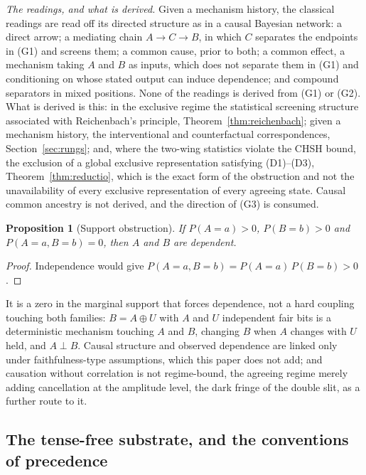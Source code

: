 \documentclass[11pt]{article}
\newtheorem{proposition}{Proposition}
\begin{document}
\textit{The readings, and what is derived.} Given a mechanism history, the classical readings are read off its directed structure as in a causal Bayesian network: a direct arrow; a mediating chain $A \to C \to B$, in which $C$ separates the endpoints in (G1) and screens them; a common cause, prior to both; a common effect, a mechanism taking $A$ and $B$ as inputs, which does not separate them in (G1) and conditioning on whose stated output can induce dependence; and compound separators in mixed positions. None of the readings is derived from (G1) or (G2). What is derived is this: in the exclusive regime the statistical screening structure associated with Reichenbach's principle, Theorem~\ref{thm:reichenbach}; given a mechanism history, the interventional and counterfactual correspondences, Section~\ref{sec:rungs}; and, where the two-wing statistics violate the CHSH bound, the exclusion of a global exclusive representation satisfying (D1)--(D3), Theorem~\ref{thm:reductio}, which is the exact form of the obstruction and not the unavailability of every exclusive representation of every agreeing state. Causal common ancestry is not derived, and the direction of (G3) is consumed.

\begin{proposition}[Support obstruction]\label{prop:support}
If $P(A = a) > 0$, $P(B = b) > 0$ and $P(A = a, B = b) = 0$, then $A$ and $B$ are dependent.
\end{proposition}

\begin{proof}
Independence would give $P(A = a, B = b) = P(A = a)\,P(B = b) > 0$.
\end{proof}

\noindent It is a zero in the marginal support that forces dependence, not a hard coupling touching both families: $B = A \oplus U$ with $A$ and $U$ independent fair bits is a deterministic mechanism touching $A$ and $B$, changing $B$ when $A$ changes with $U$ held, and $A \perp B$. Causal structure and observed dependence are linked only under faithfulness-type assumptions, which this paper does not add; and causation without correlation is not regime-bound, the agreeing regime merely adding cancellation at the amplitude level, the dark fringe of the double slit, as a further route to it.

\subsection{The tense-free substrate, and the conventions of precedence}\label{sec:tensefree}
\end{document}
